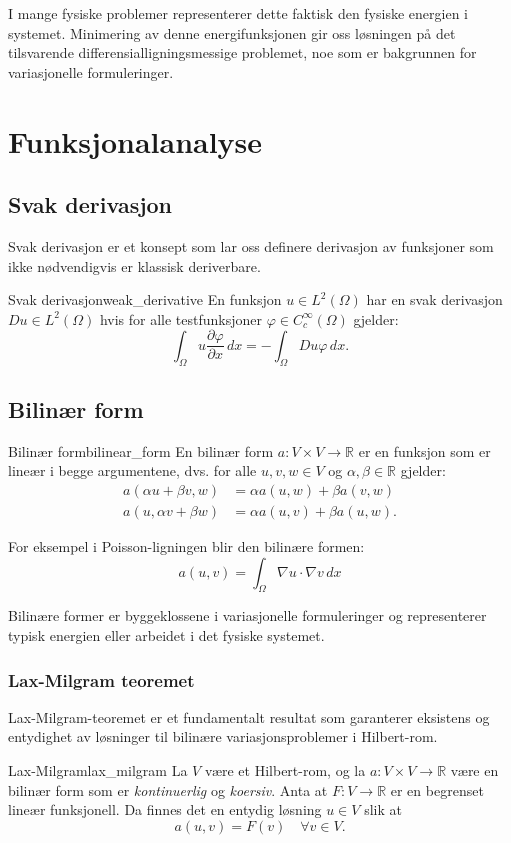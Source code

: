 I mange fysiske problemer representerer dette faktisk den fysiske energien i systemet. Minimering av denne energifunksjonen gir oss løsningen på det tilsvarende differensialligningsmessige problemet, noe som er bakgrunnen for variasjonelle formuleringer.

\section{Funksjonalanalyse}

\subsection{Svak derivasjon}
Svak derivasjon er et konsept som lar oss definere derivasjon av funksjoner som ikke nødvendigvis er klassisk deriverbare.
\begin{definition}{Svak derivasjon}{weak_derivative}
	En funksjon $u \in L^2(\Omega)$ har en svak derivasjon $Du \in L^2(\Omega)$ hvis for alle testfunksjoner $\varphi \in C_c^\infty(\Omega)$ gjelder:
	\[
		\int_\Omega u \frac{\partial \varphi}{\partial x} \, dx = -\int_\Omega Du \varphi \, dx.
	\]
\end{definition}

\subsection{Bilinær form}
\begin{definition}{Bilinær form}{bilinear_form}
	En bilinær form $a: V \times V \to \mathbb{R}$ er en funksjon som er lineær i begge argumentene, dvs. for alle $u,v,w \in V$ og $\alpha, \beta \in \mathbb{R}$ gjelder:
	\begin{align*}
		a(\alpha u + \beta v, w) & = \alpha a(u,w) + \beta a(v,w)  \\
		a(u, \alpha v + \beta w) & = \alpha a(u,v) + \beta a(u,w).
	\end{align*}
\end{definition}

For eksempel i Poisson-ligningen blir den bilinære formen:
\begin{equation}
	a(u,v) = \int_\Omega \nabla u \cdot \nabla v \, dx
\end{equation}

Bilinære former er byggeklossene i variasjonelle formuleringer og representerer typisk energien eller arbeidet i det fysiske systemet.

\subsubsection{Lax-Milgram teoremet}
\label{sec:lax_milgram}
Lax-Milgram-teoremet er et fundamentalt resultat som garanterer eksistens og entydighet av løsninger til bilinære variasjonsproblemer i Hilbert-rom.
\begin{theorem}{Lax-Milgram}{lax_milgram}
	La $V$ være et Hilbert-rom, og la $a: V \times V \to \mathbb{R}$ være en bilinær form som er \emph{kontinuerlig} og \emph{koersiv}. Anta at $F: V \to \mathbb{R}$ er en begrenset lineær funksjonell. Da finnes det en entydig løsning $u \in V$ slik at
	\[
		a(u,v) = F(v) \quad \forall v \in V.
	\]
\end{theorem}

